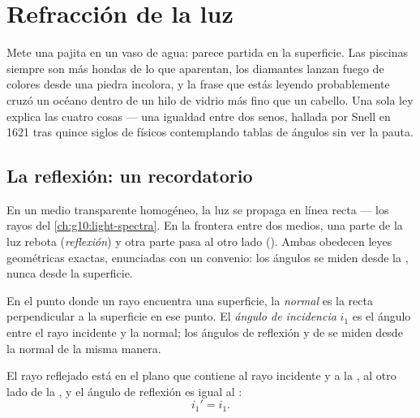 \chapter{Refracción de la luz}\label{ch:g10:refraction}

Mete una pajita en un vaso de agua: parece partida en la superficie. Las
piscinas siempre son más hondas de lo que aparentan, los diamantes
lanzan fuego de colores desde una piedra incolora, y la frase que estás
leyendo probablemente cruzó un océano dentro de un hilo de vidrio más
fino que un cabello. Una sola ley explica las cuatro cosas --- una
igualdad entre dos senos, hallada por Snell en 1621 tras quince siglos
de físicos contemplando tablas de ángulos sin ver la pauta.

\section{La reflexión: un recordatorio}

En un medio transparente homogéneo, la luz se propaga en línea recta ---
los rayos del \cref{ch:g10:light-spectra}. En la frontera entre dos
medios, una parte de la luz rebota (\emph{reflexión}) y otra parte pasa
al otro lado (\emph{}). Ambas obedecen leyes geométricas
exactas, enunciadas con un convenio: los ángulos se miden desde la
\emph{}, nunca desde la superficie.

\begin{definition}\label{def:g10:refraction:angles}
En el punto donde un rayo encuentra una superficie, la
\emph{normal} es la recta perpendicular a la superficie en
ese punto. El \emph{ángulo de incidencia}
$i_1$ es el ángulo entre el rayo incidente y la normal; los ángulos de
reflexión y de  se miden desde la normal de la misma manera.
\end{definition}

\begin{proposition}\label{prop:g10:refraction:reflection}
El rayo reflejado está en el plano que contiene al rayo incidente y a la
, al otro lado de la , y el ángulo de reflexión es igual al
:
\[
i_1' = i_1 .
\]
\end{proposition}
\admitted

